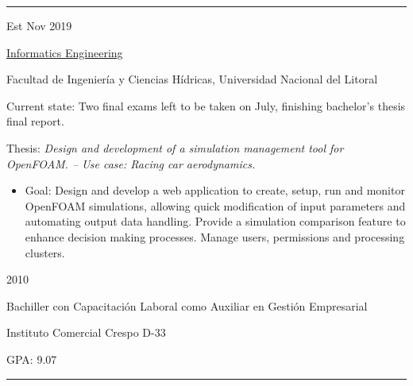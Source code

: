 \documentclass[a4paper,10pt]{article}
\newlength{\cvcolumngapwidth}
\newlength{\cvleftcolumnwidth}
\newlength{\cvrightcolumnwidth}
\newcommand{\cvsectionstyle}[1]{{\normalsize\cvsectionfont\textcolor{cvsectioncolor}{#1}}}
\newcommand{\cvtitlestyle}[1]{{\large\cvtitlefont\textcolor{cvtitlecolor}{#1}}}
\newcommand{\cvdurationstyle}[1]{{\small\cvdurationfont\textcolor{cvdurationcolor}{#1}}}
\newlength{\cvafteritemskipamount}
\newlength{\cvaftersectionskipamount}
\newlength{\cvaftertitleskipamount}
\newlength{\cvparskip}
\newcommand{\cvsection}[1]{
    \begin{minipage}[t]{\cvleftcolumnwidth}
        \raggedleft\cvsectionstyle{#1}
    \end{minipage}%
    \hspace{\cvcolumngapwidth}%
    \begin{minipage}[t]{\cvrightcolumnwidth}
        \textcolor{cvrulecolor}{\rule{\cvrightcolumnwidth}{0.3mm}}
    \end{minipage}

    \vspace{\cvaftersectionskipamount}
}
\newcommand{\cvitem}[2]{
    \begin{minipage}[t]{\cvleftcolumnwidth}
        \raggedleft #1
    \end{minipage}%
    \hspace{\cvcolumngapwidth}%
    \begin{minipage}[t]{\cvrightcolumnwidth}
        \setlength{\parskip}{\cvparskip} #2
    \end{minipage}

    \vspace{\cvafteritemskipamount}
}
\newcommand{\cvtitle}[1]{
    \cvtitlestyle{#1}

    \vspace{\cvaftertitleskipamount}
    \vspace{-\cvparskip}
}
\begin{document}

\cvsection{EDUCATION}

\cvitem{
    \cvdurationstyle{Est Nov 2019}
}{
    \cvtitle{\href{http://fich.unl.edu.ar/planificaciones/carrera.php?id=3}{Informatics Engineering}}

    Facultad de Ingeniería y Ciencias Hídricas, Universidad Nacional del Litoral
    
    Current state: Two final exams left to be taken on July, finishing bachelor's thesis final report.
    
    Thesis: \textit{Design and development of a simulation management tool for OpenFOAM. -- \small{Use case: Racing car aerodynamics.}}
    \small{
    \begin{itemize}
        \item Goal: Design and develop a web application to create, setup, run and monitor OpenFOAM simulations, allowing quick modification of input parameters and automating output data handling. Provide a simulation comparison feature to enhance decision making processes. Manage users, permissions and processing clusters.
    \end{itemize}{}
    }

}

\cvitem{
    \cvdurationstyle{2010}
}{
    \cvtitle{Bachiller con Capacitación Laboral como Auxiliar en Gestión \newline Empresarial}

    Instituto Comercial Crespo D-33
    
    GPA: 9.07
    
}


\cvsection{COURSES \& CONFERENCES}
\end{document}
